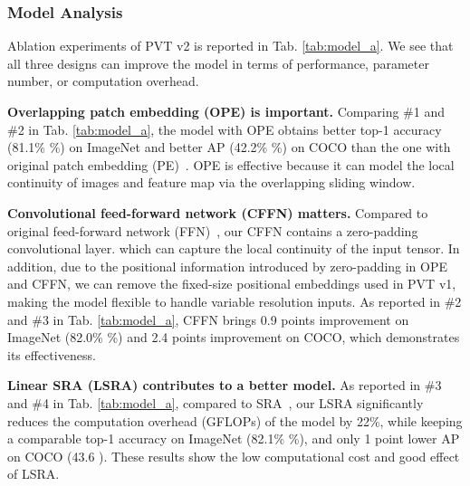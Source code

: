 \documentclass[10pt,twocolumn,letterpaper]{article}
\begin{document}
	\subsubsection{Model Analysis}
	Ablation experiments of PVT v2 is reported in Tab. \ref{tab:model_a}.
	We see that all three designs can improve the model in terms of performance, parameter number, or computation overhead.
	
	\noindent\textbf{Overlapping patch embedding (OPE) is important.} Comparing \#1 and \#2 in Tab. \ref{tab:model_a}, 
	the model with OPE obtains better top-1 accuracy (81.1\% \%) on ImageNet and better AP (42.2\% \%) on COCO than the one with original patch embedding (PE)~\cite{dosovitskiy2020image}. OPE is effective because it can model the local continuity of images and feature map via the overlapping sliding window.
	
	\noindent\textbf{Convolutional feed-forward network (CFFN) matters.} Compared to original feed-forward network (FFN)~\cite{dosovitskiy2020image}, our CFFN contains a zero-padding convolutional layer. which can capture the local continuity of the input tensor. 
	In addition, due to the positional information introduced by zero-padding in OPE and CFFN, we can remove the fixed-size positional embeddings used in PVT v1,
	making the model flexible to handle variable resolution inputs.
	As reported in \#2 and \#3 in Tab. \ref{tab:model_a}, CFFN brings 0.9 points improvement on ImageNet (82.0\% \%) and 2.4 points improvement on COCO, which demonstrates its effectiveness.
	
	\noindent\textbf{Linear SRA (LSRA) contributes to a better model.}
	As reported in \#3 and \#4 in Tab. \ref{tab:model_a}, compared to SRA~\cite{pvt}, our LSRA significantly reduces the computation overhead (GFLOPs) of the model by 22\%, while keeping a comparable top-1 accuracy on ImageNet (82.1\% \%), and only 1 point lower AP on COCO (43.6 ).
	These results show the low computational cost and good effect of LSRA.
	
\end{document}
